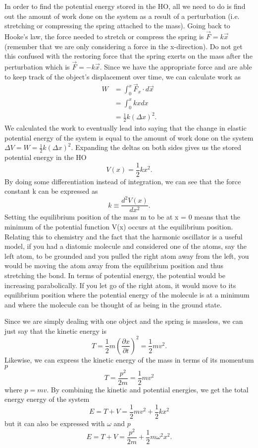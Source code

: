 \documentclass{article}
\newcommand{\be}{\begin{equation}}
\newcommand{\ee}{\end{equation}}
\begin{document}
In order to find the potential energy stored in the HO, all we need to do is find out the amount of work done on the system as a result of a perturbation (i.e. stretching or
compressing the spring attached to the mass). Going back to Hooke's law, the force needed to stretch or compress the spring is $\vec{F} = k \vec{x}$ (remember that we are
only considering a force in the x-direction). Do not get this confused with the restoring force that the spring exerts on the mass after the perturbation which is $\vec{F} = - k \vec{x}$.
Since we have the appropriate force and are able to keep track of the object's displacement over time, we can calculate work as
\be
\begin{split}
W &= \int_{0}^{x} \vec{F}_x \cdot d\vec{x} \\
&= \int_{0}^{x} k x dx \\
&= \frac{1}{2}k (\Delta x)^2 .
\end{split}
\ee
We calculated the work to eventually lead into saying that the change in elastic potential energy of the system is equal to the amount of work done on the system $\Delta V = W = \frac{1}{2}k (\Delta x)^2$. Expanding the deltas on both sides gives us the stored potential energy in the HO
\be
V(x) = \frac{1}{2}k x^2.
\ee
By doing some differentiation instead of integration, we can see that the force constant k can be expressed as
\be
k \equiv \frac{d^2 V(x)}{d x^2}.
\ee
Setting the equilibrium position of the mass m to be at x = 0 means that the minimum of the potential function V(x) occurs at the equilibrium position. Relating this to chemistry
and the fact that the harmonic oscillator is a useful model, if you had a diatomic molecule and considered one of the atoms, say the left atom, to be grounded and you pulled the
right atom away from the left, you would be moving the atom away from the equilibrium position and thus stretching the bond. In terms of potential energy, the potential would be
increasing parabolically. If you let go of the right atom, it would move to its equilibrium position where the potential energy of the molecule is at a minimum and where the
molecule can be thought of as being in the ground state.

Since we are simply dealing with one object and the spring is massless, we can just say that the kinetic energy is
\be
T = \frac{1}{2}m (\frac{\partial x}{\partial t})^2 = \frac{1}{2}m v^2.
\ee
Likewise, we can express the kinetic energy of the mass in terms of its momentum $p$
\be
T = \frac{p^2}{2 m} = \frac{1}{2} m v^2
\ee
where $p = mv$. By combining the kinetic and potential energies, we get the total energy energy of the system
\be
E = T + V = \frac{1}{2}mv^2 + \frac{1}{2}kx^2
\ee
but it can also be expressed with $\omega$ and $p$
\be
E = T + V = \frac{p^2}{2 m} + \frac{1}{2}m  \omega^2 x^2 .
\ee
\end{document}
